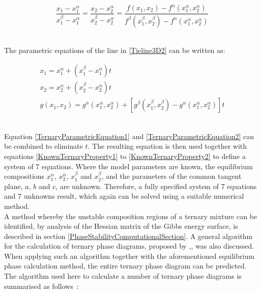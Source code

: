 \begin{equation}
\dfrac{x_{1}- x_{1}^{\alpha}}{x_{1}^{\beta} - x_{1}^{\alpha}} = \dfrac{x_{2}- x_{2}^{\alpha}}{x_{2}^{\beta} - x_{2}^{\alpha}} = \dfrac{f\left(x_{1}, x_{2}\right)- f^{\alpha}\left(x_{1}^{\alpha}, x_{2}^{\alpha}\right)}{f^{\beta}\left(x_{1}^{\beta}, x_{2}^{\beta}\right) - f^{\alpha}\left(x_{1}^{\alpha}, x_{2}^{\alpha}\right)} \label{Tieline3D2}
\end{equation}\

The parametric equations of the line in \ref{Tieline3D2} can be written as:\

\begin{eqnarray}
x_{1} = x_{1}^{\alpha} + \left(x_{1}^{\beta} - x_{1}^{\alpha}\right)t\\
x_{2} = x_{2}^{\alpha} + \left(x_{2}^{\beta} - x_{2}^{\alpha}\right)t\label{TernaryParametricEquation1}\\
g\left(x_{1}, x_{2}\right) =  g^{\alpha}\left(x_{1}^{\alpha}, x_{2}^{\alpha}\right) + \left[g^{\beta}\left(x_{1}^{\beta}, x_{2}^{\beta}\right) - g^{\alpha}\left(x_{1}^{\alpha}, x_{2}^{\alpha}\right)\right]t \label{TernaryParametricEquation2}
\end{eqnarray}\

Equation \ref{TernaryParametricEquation1} and \ref{TernaryParametricEquation2} can be combined to eliminate $t$. The resulting equation is then used together with equations \ref{KnownTernaryProperty1} to \ref{KnownTernaryProperty2} to define a system of 7 equations. Where the model parameters are known, the equilibrium compositions $x_{1}^{\alpha}$, $x_{2}^{\alpha}$, $x_{1}^{\beta}$ and $x_{2}^{\beta}$, and the parameters of the common tangent plane, $a$, $b$ and $c$, are unknown. Therefore, a fully specified system of 7 equations and 7 unknowns result, which again can be solved using a suitable numerical method.\\

A method whereby the unstable composition regions of a ternary mixture can be identified, by analysis of the Hessian matrix of the Gibbs energy surface, is described in section \ref{PhaseStabilityComputationalSection}. A general algorithm for the calculation of ternary phase diagrams, proposed by \citeauthor{HessianPhaseDiagramConstruction},\citeyear{HessianPhaseDiagramConstruction}, was also discussed. When applying such an algorithm together with the aforementioned equilibrium phase calculation method, the entire ternary phase diagram can be predicted. The algorithm used here to calculate a number of ternary phase diagrams is summarised as follows~\cite{HessianPhaseDiagramConstruction, HessianPhaseEquilibriumCriterion}:\

